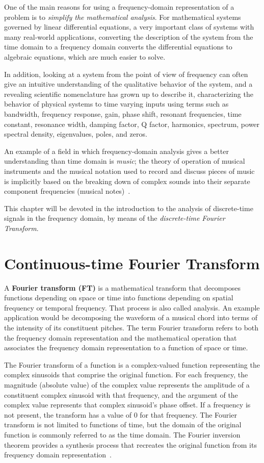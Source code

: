 \documentclass[\documentfontsize, twocolumn]{\classname}
\begin{document}
One of the main reasons for using a frequency-domain representation of a problem is to \emph{simplify the mathematical analysis}. For mathematical systems governed by linear differential equations, a very important class of systems with many real-world applications, converting the description of the system from the time domain to a frequency domain converts the differential equations to algebraic equations, which are much easier to solve.

In addition, looking at a system from the point of view of frequency can often give an intuitive understanding of the qualitative behavior of the system, and a revealing scientific nomenclature has grown up to describe it, characterizing the behavior of physical systems to time varying inputs using terms such as bandwidth, frequency response, gain, phase shift, resonant frequencies, time constant, resonance width, damping factor, Q factor, harmonics, spectrum, power spectral density, eigenvalues, poles, and zeros.

An example of a field in which frequency-domain analysis gives a better understanding than time domain is \emph{music}; the theory of operation of musical instruments and the musical notation used to record and discuss pieces of music is implicitly based on the breaking down of complex sounds into their separate component frequencies (musical notes)~\cite{bib:frequencyDomain}.

This chapter will be devoted in the introduction to the analysis of discrete-time signals in the frequency domain, by means of the \emph{discrete-time Fourier Transform}.


\section{Continuous-time Fourier Transform}\label{sec:continuousTimeFourierTransform}

A \textbf{Fourier transform (FT)} is a mathematical transform that decomposes functions depending on space or time into functions depending on spatial frequency or temporal frequency. That process is also called analysis. An example application would be decomposing the waveform of a musical chord into terms of the intensity of its constituent pitches. The term Fourier transform refers to both the frequency domain representation and the mathematical operation that associates the frequency domain representation to a function of space or time.

The Fourier transform of a function is a complex-valued function representing the complex sinusoids that comprise the original function. For each frequency, the magnitude (absolute value) of the complex value represents the amplitude of a constituent complex sinusoid with that frequency, and the argument of the complex value represents that complex sinusoid's phase offset. If a frequency is not present, the transform has a value of 0 for that frequency. The Fourier transform is not limited to functions of time, but the domain of the original function is commonly referred to as the time domain. The Fourier inversion theorem provides a synthesis process that recreates the original function from its frequency domain representation~\cite{bib:fourierTransform}.
\end{document}
